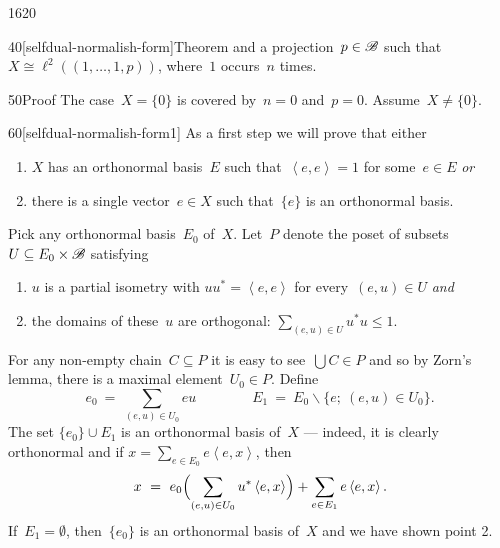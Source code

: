 \begin{parsec}{1620}
\begin{point}{40}[selfdual-normalish-form]{Theorem}
    and a projection~$p \in \mathscr{B}$
    such that~$X \cong \ell^2((1, \ldots, 1, p))$,
    where~$1$ occurs~$n$ times.
\begin{point}{50}{Proof}%
The case~$X = \{0\}$ is covered by~$n=0$ and~$p=0$.
Assume~$X \neq \{0\}$.
\begin{point}{60}[selfdual-normalish-form1]%
As a first step we will prove that
either
\begin{enumerate}
\item $X$ has an orthonormal basis~$E$
    such that~$\left<e,e\right>=1$ for some~$e \in E$ \emph{or}
\item there is a single vector~$e \in X$ such that~$\{e\}$ is an orthonormal basis.
\end{enumerate}
Pick any orthonormal basis~$E_0$ of~$X$.
Let~$P$ denote the poset of subsets~$U \subseteq E_0 \times \mathscr{B}$
    satisfying
\begin{enumerate}
    \item
    $u$ is a partial isometry with $uu^* = \left<e,e\right>$
        for every~$(e,u) \in U$ \emph{and}
    \item
    the domains of these~$u$ are orthogonal:  $\sum_{(e,u) \in U} u^*u \leq 1$.
\end{enumerate}
For any non-empty chain~$C \subseteq P$
    it is easy to see~$\bigcup C \in P$
    and so by Zorn's lemma,
    there is a maximal element~$U_0 \in P$.
Define
\begin{equation*}
e_0 \ =\  \sum_{(e,u) \in U_0} eu
    \qquad \qquad E_1 \ = \ E_0 \backslash \{e;\ (e,u) \in U_0\}.
\end{equation*}
The set $\{e_0\} \cup E_1$ is an orthonormal basis of~$X$
    --- indeed, it is clearly orthonormal and
    if $x = \sum_{e \in E_0} e \left<e,x\right>$,
    then
\begin{equation*}
    x \ =\  e_0 \Bigl(\sum_{(e,u) \in U_0} u^*\left<e,x\right>\Bigr)
            + \sum_{e \in E_1} e\left<e,x\right>.
\end{equation*}
If~$E_1 = \emptyset$, then~$\{e_0\}$ is an orthonormal basis of~$X$ and
    we have shown point 2.


\end{point}
\end{point}
\end{point}
\end{parsec}
